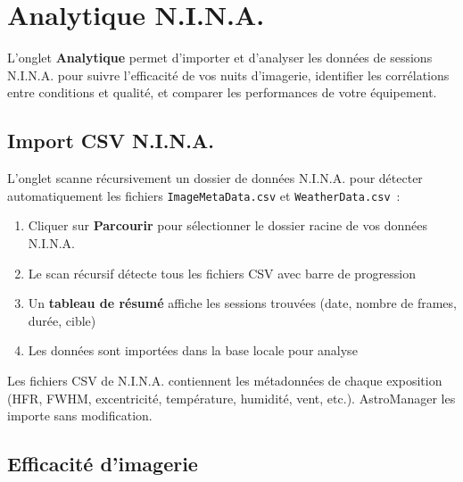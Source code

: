 \documentclass[a4paper,11pt]{article}
\begin{document}
\section{Analytique N.I.N.A.}
\label{sec:analytique}

\begin{tcolorbox}[
    enhanced, colback=successgreen!8, colframe=successgreen!60,
    coltitle=white, fonttitle=\bfseries,
    title={NOUVEAU dans v1.3.0}
]
L'onglet \textbf{Analytique} permet d'importer et d'analyser les donn\'{e}es de sessions N.I.N.A. pour suivre l'efficacit\'{e} de vos nuits d'imagerie, identifier les corr\'{e}lations entre conditions et qualit\'{e}, et comparer les performances de votre \'{e}quipement.
\end{tcolorbox}

\subsection{Import CSV N.I.N.A.}

L'onglet scanne r\'{e}cursivement un dossier de donn\'{e}es N.I.N.A. pour d\'{e}tecter automatiquement les fichiers \texttt{ImageMetaData.csv} et \texttt{WeatherData.csv}~:

\begin{enumerate}
    \item Cliquer sur \textbf{Parcourir} pour s\'{e}lectionner le dossier racine de vos donn\'{e}es N.I.N.A.
    \item Le scan r\'{e}cursif d\'{e}tecte tous les fichiers CSV avec barre de progression
    \item Un \textbf{tableau de r\'{e}sum\'{e}} affiche les sessions trouv\'{e}es (date, nombre de frames, dur\'{e}e, cible)
    \item Les donn\'{e}es sont import\'{e}es dans la base locale pour analyse
\end{enumerate}

\begin{notebox}
Les fichiers CSV de N.I.N.A. contiennent les m\'{e}tadonn\'{e}es de chaque exposition (HFR, FWHM, excentricit\'{e}, temp\'{e}rature, humidit\'{e}, vent, etc.). AstroManager les importe sans modification.
\end{notebox}

\subsection{Efficacit\'{e} d'imagerie}
\end{document}

